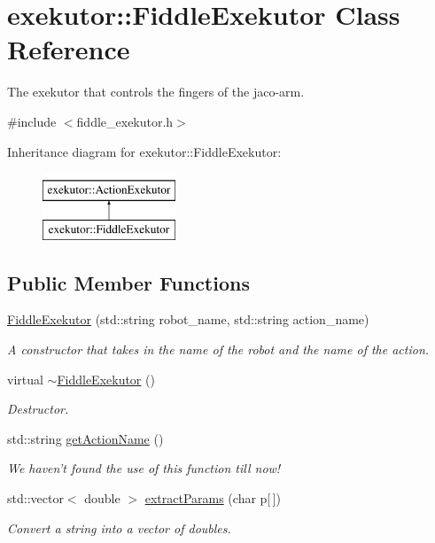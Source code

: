 \hypertarget{classexekutor_1_1FiddleExekutor}{\section{exekutor\-:\-:\-Fiddle\-Exekutor \-Class \-Reference}
\label{classexekutor_1_1FiddleExekutor}
}


\-The exekutor that controls the fingers of the jaco-\/arm.  




{\ttfamily \#include $<$fiddle\-\_\-exekutor.\-h$>$}

\-Inheritance diagram for exekutor\-:\-:\-Fiddle\-Exekutor\-:\begin{figure}[H]
\begin{center}
\leavevmode
\includegraphics[height=2.000000cm]{classexekutor_1_1FiddleExekutor}
\end{center}
\end{figure}
\subsection*{\-Public \-Member \-Functions}
\begin{DoxyCompactItemize}
\item 
\hyperlink{classexekutor_1_1FiddleExekutor_aeb3836067d3aa5f4378c0ea686468b43}{\-Fiddle\-Exekutor} (std\-::string robot\-\_\-name, std\-::string action\-\_\-name)
\begin{DoxyCompactList}\small\item\em \-A constructor that takes in the name of the robot and the name of the action. \end{DoxyCompactList}\item 
virtual \hyperlink{classexekutor_1_1FiddleExekutor_ac5c54c7d655957b81987650e1f03fad2}{$\sim$\-Fiddle\-Exekutor} ()
\begin{DoxyCompactList}\small\item\em \-Destructor. \end{DoxyCompactList}\item 
std\-::string \hyperlink{classexekutor_1_1ActionExekutor_a48d170d3931798f4019856fc0f070392}{get\-Action\-Name} ()
\begin{DoxyCompactList}\small\item\em \-We haven't found the use of this function till now! \end{DoxyCompactList}\item 
std\-::vector$<$ double $>$ \hyperlink{classexekutor_1_1ActionExekutor_af8ca9f59f077baad45a8cba4ab774e82}{extract\-Params} (char p\mbox{[}$\,$\mbox{]})
\begin{DoxyCompactList}\small\item\em \-Convert a string into a vector of doubles. \end{DoxyCompactList}\end{DoxyCompactItemize}
